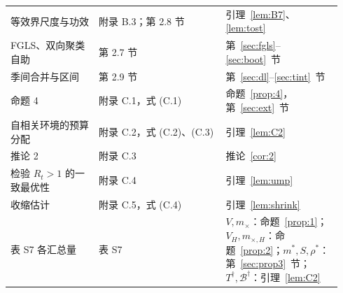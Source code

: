 \documentclass[fontset=none,11pt,a4paper,fleqn]{ctexart}
\numberwithin{equation}{section}
\theoremstyle{zhthm}
\theoremstyle{zhrem}
\newcommand{\mx}{m_{\times}}
\begin{document}
\begin{small}
\begin{longtable}{@{}p{0.25\linewidth}p{0.36\linewidth}p{0.33\linewidth}@{}}
等效界尺度与功效 & 附录 B.3；第 2.8 节 & 引理~\ref{lem:B7}、\ref{lem:tost} \\
FGLS、双向聚类自助 & 第 2.7 节 & 第~\ref{sec:fgls}--\ref{sec:boot}~节 \\
季间合并与区间 & 第 2.9 节 & 第~\ref{sec:dl}--\ref{sec:tint}~节 \\
命题 4 & 附录 C.1，式 (C.1) & 命题~\ref{prop:4}，第~\ref{sec:ext}~节 \\
自相关环境的预算分配 & 附录 C.2，式 (C.2)、(C.3) & 引理~\ref{lem:C2} \\
推论 2 & 附录 C.3 & 推论~\ref{cor:2} \\
检验 $R_t>1$ 的一致最优性 & 附录 C.4 & 引理~\ref{lem:ump} \\
收缩估计 & 附录 C.5，式 (C.4) & 引理~\ref{lem:shrink} \\
表 S7 各汇总量 & 表 S7 & $V,\mx$：命题~\ref{prop:1}；$V_H,m_{\times,H}$：命题~\ref{prop:2}；$m^*,S,\rho^*$：第~\ref{sec:prop3}~节；$T^\dagger,\mathcal B^\dagger$：引理~\ref{lem:C2} \\
\end{longtable}
\end{small}
\end{document}
